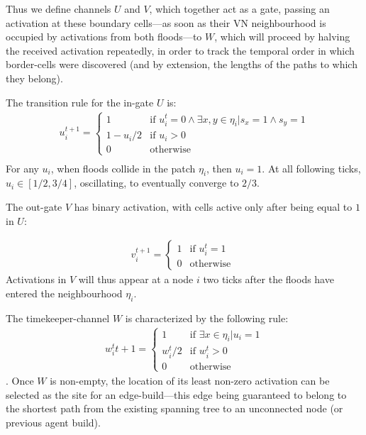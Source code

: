 \documentclass{article}
\begin{document}
\begin{appendices}
Thus we define channels $U$ and $V$, which together act as a gate, passing an activation at these boundary cells---as soon as their VN neighbourhood is occupied by activations from both floods---to $W$, which will proceed by halving the received activation repeatedly, in order to track the temporal order in which border-cells were discovered (and by extension, the lengths of the paths to which they belong). 

The transition rule for the in-gate $U$ is:
\begin{align*}
	u_i^{t+1} = 
\begin{cases}
	1 & \text{if } u_i^t = 0 \wedge \exists x, y \in \eta_i | s_x = 1 \wedge s_y = 1 \\
	1 - u_i / 2 & \text{if } u_i > 0\\
	0 & \text{otherwise}
\end{cases} \\
\end{align*}
For any $u_i$, when floods collide in the patch $\eta_i$, then $u_i = 1$. At all following ticks, $u_i \in [1/2, 3/4]$, oscillating, to eventually converge to $2/3$. 

The out-gate $V$ has binary activation, with cells active only after being equal to $1$ in $U$:

\begin{align*}
	v_i^{t+1} =
	\begin{cases}
		1 & \text{if } u_i^t = 1 \\
		0 & \text{otherwise }
	\end{cases}
	\end{align*}
	Activations in $V$ will thus appear at a node $i$ two ticks after the floods have entered the neighbourhood $\eta_i$.

The timekeeper-channel $W$ is characterized by the following rule:
\begin{align*}
 w_i^t{t+1} =
\begin{cases}
	1 & \text{if } \exists x \in \eta_i | u_i = 1 \\
	w_i^t/2 & \text{if } w_i^t > 0 \\
	0 & \text{otherwise}
\end{cases}
\end{align*}
. Once $W$ is non-empty, the location of its least non-zero activation can be selected as the site for an edge-build---this edge being guaranteed to belong to the shortest path from the existing spanning tree to an unconnected node (or previous agent build).





\newpage




%
\end{appendices}
\end{document}
